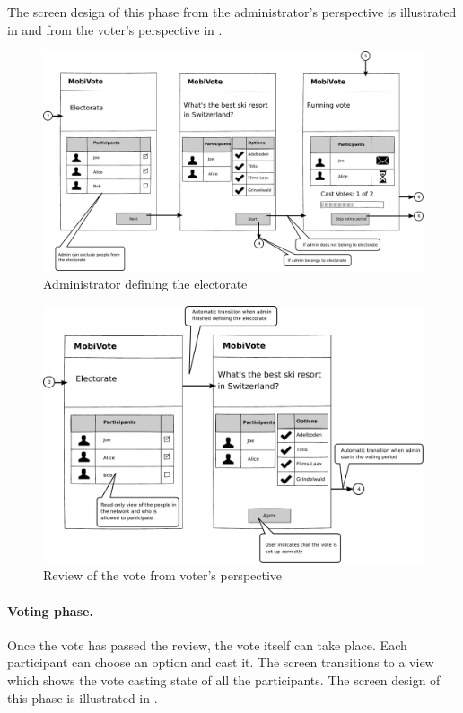 \documentclass[numbers=noenddot, abstract=on, a4paper, headsepline,
footsepline, oneside, draft=off]{scrreprt}
\begin{document}
The screen design of this phase from the administrator's perspective is
illustrated in  and from the voter's perspective in
.

\begin{figure}[htb]
	\centering
	\includegraphics[height=.3\textheight]{img/storyboard/admin_review}
	\caption{Administrator defining the electorate}
	\label{fig:admin_review}
\end{figure}

\begin{figure}[htb]
	\centering
	\includegraphics[height=.3\textheight]{img/storyboard/voter_review}
	\caption{Review of the vote from voter's perspective}
	\label{fig:voter_review}
\end{figure}

\paragraph{Voting phase.}
Once the vote has passed the review, the vote itself can take place. Each
participant can choose an option and cast it. The screen transitions to a view
which shows the vote casting state of all the participants. The screen
design of this phase is illustrated in .
\end{document}
